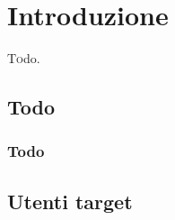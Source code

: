 \chapter{Introduzione\label{sec:introduzione}}
\lettrine[findent=1.5em]{T}odo.

\section{Todo\label{sec:todo}}

\subsection{Todo\label{sec:todo}}

\section{Utenti target}